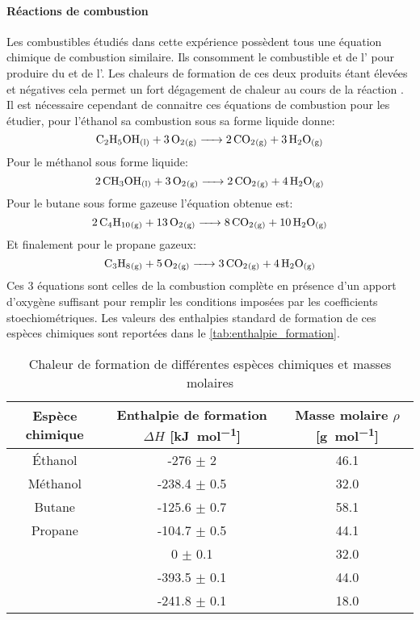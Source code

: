 \paragraph*{Réactions de combustion}
Les combustibles étudiés dans cette expérience possèdent tous une équation chimique de combustion similaire. Ils consomment le combustible et de l' pour produire du  et de l'. Les chaleurs de formation de ces deux produits étant élevées et négatives cela permet un fort dégagement de chaleur au cours de la réaction \cite{notice}. Il est nécessaire cependant de connaitre ces équations de combustion pour les étudier, pour l'éthanol  sa combustion sous sa forme liquide donne:
\begin{equation}
    \ce{ C_2H_5OH_{(l)} + 3O_2_{(g)} -> 2CO_2_{(g)} + 3H_2O_{(g)} }
    \label{eq:ethanol_combustion}
\end{equation}
Pour le méthanol  sous forme liquide:
\begin{equation}
    \ce{ 2CH3OH_{(l)} + 3O_2_{(g)} -> 2CO_2_{(g)} + 4H_2O_{(g)} }
    \label{eq:methanol_combustion}
\end{equation}
Pour le butane  sous forme gazeuse l'équation obtenue est:
\begin{equation}
    \ce{ 2C_4H_{10}_{(g)} + 13O_2_{(g)} -> 8CO_2_{(g)} + 10H_2O_{(g)} }
    \label{eq:butane_combustion}
\end{equation}
Et finalement pour le propane  gazeux:
\begin{equation}
    \ce{ C_3H_8_{(g)} + 5O_2_{(g)} -> 3CO_2_{(g)} + 4H_2O_{(g)} }
    \label{eq:propane_combustion}
\end{equation}
Ces 3 équations sont celles de la combustion complète en présence d'un apport d'oxygène suffisant pour remplir les conditions imposées par les coefficients stoechiométriques. Les valeurs des enthalpies standard de formation de ces espèces chimiques sont reportées dans le \autoref{tab:enthalpie_formation}.

\begin{table}[h]
    \centering
    \begin{tabulary}{\linewidth}{C C C}
        \toprule
        Espèce chimique & Enthalpie de formation \(\Delta H\) [\si{\kilo\joule\per\mole}] & Masse molaire \(\rho\) [\si{\gram\per\mole}]\\
        \midrule
        Éthanol & -276 \(\pm\) 2 & 46.1\\
        Méthanol & -238.4 \(\pm\) 0.5 & 32.0\\
        Butane & -125.6 \(\pm\) 0.7 & 58.1\\
        Propane & -104.7 \(\pm\) 0.5 & 44.1\\
         & 0 \(\pm\) 0.1 & 32.0\\
         & -393.5 \(\pm\) 0.1 & 44.0\\
         & -241.8 \(\pm\) 0.1 & 18.0\\
        \bottomrule
    \end{tabulary}
    \caption{Chaleur de formation de différentes espèces chimiques et masses molaires \cite{notice} \cite{NIST}}
    \label{tab:enthalpie_formation}
\end{table}